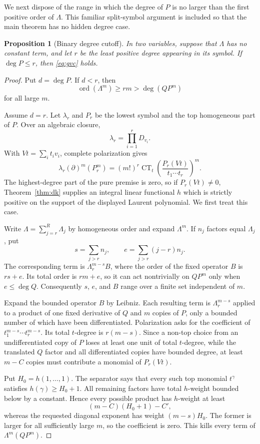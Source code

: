 \documentclass[11pt]{article}
\newtheorem{proposition}[theorem]{Proposition}
\newcommand{\CT}{\operatorname{CT}}
\begin{document}
We next dispose of the range in which the degree of $P$ is no larger than
the first positive order of $\Lambda$.  This familiar split-symbol argument
is included so that the main theorem has no hidden degree case.

\begin{proposition}[Binary degree cutoff]\label{prop:cutoff}
In two variables, suppose that $\Lambda$ has no constant term, and let $r$
be the least
positive degree appearing in its symbol.  If $\deg P\leq r$, then
\eqref{eq:gvc} holds.
\end{proposition}

\begin{proof}
Put $d=\deg P$.  If $d<r$, then
\[
 \operatorname{ord}(\Lambda^m)\geq rm>\deg(QP^m)
\]
for all large $m$.

Assume $d=r$.  Let $\lambda_r$ and $P_r$ be the lowest symbol and the top
homogeneous part of $P$.  Over an algebraic closure,
\[
 \lambda_r=\prod_{i=1}^r D_{v_i}.
\]
With $Vt=\sum_i t_iv_i$, complete polarization gives
\[
 \lambda_r(\partial)^m(P_r^m)
 =(m!)^r\CT_t\left(
       \frac{P_r(Vt)}{t_1\cdots t_r}
                  \right)^m.
\]
The highest-degree part of the pure premise is zero, so if $P_r(Vt)\ne0$,
Theorem~\ref{thm:dk} supplies an integral linear functional $h$ which is
strictly positive on the support of the displayed Laurent polynomial.  We
first treat this case.

Write $\Lambda=\sum_{j=r}^R\Lambda_j$ by homogeneous order and expand
$\Lambda^m$.  If $n_j$ factors equal $\Lambda_j$, put
\[
 s=\sum_{j>r}n_j,
 \qquad e=\sum_{j>r}(j-r)n_j.
\]
The corresponding term is $\Lambda_r^{m-s}B$, where the order of the fixed
operator $B$ is $rs+e$.  Its total order is $rm+e$, so it can act
nontrivially on $QP^m$ only when $e\leq\deg Q$.  Consequently $s$, $e$, and
$B$ range over a finite set independent of $m$.

Expand the bounded operator $B$ by Leibniz.  Each resulting term is
$\Lambda_r^{m-s}$ applied to a product of one fixed derivative of $Q$ and
$m$ copies of $P$, only a bounded number of which have been differentiated.
Polarization asks for the coefficient of
$t_1^{m-s}\cdots t_r^{m-s}$.  Its total $t$-degree is $r(m-s)$.  Since a
non-top choice from an undifferentiated copy of $P$ loses at least one unit
of total $t$-degree, while the translated $Q$ factor and all differentiated
copies have bounded degree, at least $m-C$ copies must contribute a monomial
of $P_r(Vt)$.

Put $H_0=h(1,\ldots,1)$.  The separator says that every such top monomial
$t^\gamma$ satisfies $h(\gamma)\geq H_0+1$.  All remaining factors have
total $h$-weight bounded below by a constant.  Hence every possible product
has $h$-weight at least
\[
 (m-C)(H_0+1)-C',
\]
whereas the requested diagonal exponent has weight $(m-s)H_0$.  The former
is larger for all sufficiently large $m$, so the coefficient is zero.  This
kills every term of $\Lambda^m(QP^m)$.


\end{proof}
\end{document}
